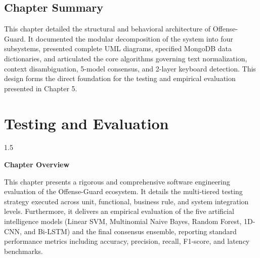 \documentclass[A4paper,12pt]{report}
\theoremstyle{plain}
\theoremstyle{definition}
\theoremstyle{remark}
\numberwithin{equation}{section}
\begin{document}
\section{Chapter Summary}
This chapter detailed the structural and behavioral architecture of Offense-Guard. It documented the modular decomposition of the system into four subsystems, presented complete UML diagrams, specified MongoDB data dictionaries, and articulated the core algorithms governing text normalization, context disambiguation, 5-model consensus, and 2-layer keyboard detection. This design forms the direct foundation for the testing and empirical evaluation presented in Chapter 5.

\chapter{Testing and Evaluation}
\thispagestyle{empty}
\newpage
\begin{spacing}{1.5}

\thispagestyle{empty}

{\centering \Large \bfseries Chapter Overview \par}
\vspace{1cm}

This chapter presents a rigorous and comprehensive software engineering evaluation of the Offense-Guard ecosystem. It details the multi-tiered testing strategy executed across unit, functional, business rule, and system integration levels. Furthermore, it delivers an empirical evaluation of the five artificial intelligence models (Linear SVM, Multinomial Naive Bayes, Random Forest, 1D-CNN, and Bi-LSTM) and the final consensus ensemble, reporting standard performance metrics including accuracy, precision, recall, F1-score, and latency benchmarks.

\end{spacing}
\end{document}
